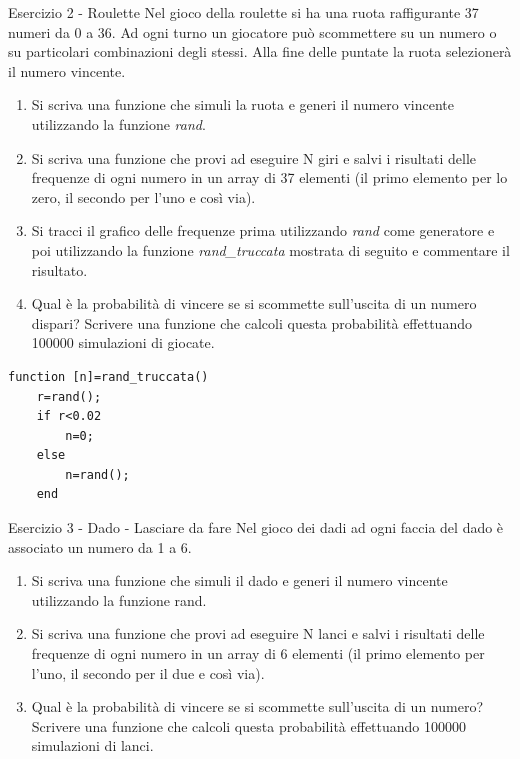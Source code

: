 \documentclass[handout]{beamer}
\begin{document}
\begin{frame}{Esercizio 2 - Roulette}
	Nel gioco della roulette si ha una ruota raffigurante 37
	numeri da 0 a 36. Ad ogni turno un giocatore può
	scommettere su un numero o su particolari combinazioni
	degli stessi. Alla fine delle puntate la ruota selezionerà il
	numero vincente.
	
	\begin{enumerate}
		\item Si scriva una funzione che simuli la ruota e generi il
		numero vincente utilizzando la funzione \emph{rand}.
		\item Si scriva una funzione che provi ad eseguire N giri e salvi
		i risultati delle frequenze di ogni numero in un array di
		37 elementi (il primo elemento per lo zero, il secondo per
		l'uno e così via).
		\item Si tracci il grafico delle frequenze prima utilizzando
		\emph{rand} come generatore e poi utilizzando la funzione
		\emph{rand\_truccata} mostrata di seguito e commentare il
		risultato.
		\item Qual è la probabilità di vincere se si scommette
		sull'uscita di un numero dispari? Scrivere una funzione
		che calcoli questa probabilità effettuando 100000
		simulazioni di giocate.
	\end{enumerate}
	
	\framebreak
	\begin{lstlisting}
function [n]=rand_truccata()
	r=rand();
	if r<0.02	
		n=0;
	else
		n=rand();
	end
	\end{lstlisting}
\end{frame}

\begin{frame}[allowframebreaks]{Esercizio 3 - Dado - Lasciare da fare}
	Nel gioco dei dadi ad ogni faccia del dado è associato un
	numero da 1 a 6.
	
	\begin{enumerate}
		\item Si scriva una funzione che simuli il dado e generi il
		numero vincente utilizzando la funzione rand.
		\item Si scriva una funzione che provi ad eseguire N lanci e
		salvi i risultati delle frequenze di ogni numero in un array
		di 6 elementi (il primo elemento per l’uno, il secondo per
		il due e così via).
		\item Qual è la probabilità di vincere se si scommette
		sull'uscita di un numero? Scrivere una funzione che
		calcoli questa probabilità effettuando 100000 simulazioni
		di lanci.
	\end{enumerate}
\end{frame}
\end{document}
